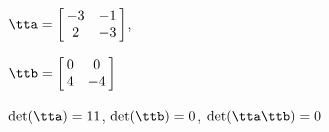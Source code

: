 {$\tta = \left[\hskip -3pt \begin{array}{cc} -3&-1\\  2&-3\end {array} \hskip -3pt
 \right] $, 

$\ttb = \left[\hskip -3pt \begin{array}{cc} 0&0\\  4&-4\end {array} \hskip -3pt
 \right]$}
{$\det(\tta)=11$, $\det(\ttb)=0$, $\det(\tta\ttb)=0$}






  

